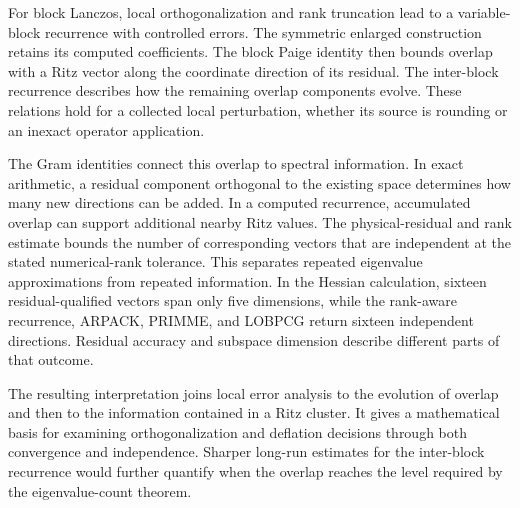 \documentclass[11pt]{article}
\theoremstyle{definition}
\begin{document}
For block Lanczos, local orthogonalization and rank truncation lead to a
variable-block recurrence with controlled errors. The symmetric enlarged
construction retains its computed coefficients. The block Paige identity
then bounds overlap with a Ritz vector along the coordinate direction of
its residual. The inter-block recurrence describes how the remaining
overlap components evolve.
These relations hold for a collected local perturbation, whether its source
is rounding or an inexact operator application.

The Gram identities connect this overlap to spectral information. In exact
arithmetic, a residual component orthogonal to the existing space determines
how many new directions can be added. In a computed recurrence, accumulated
overlap can support additional nearby Ritz values. The physical-residual and
rank estimate bounds the number of corresponding vectors that are independent
at the stated numerical-rank tolerance.
This separates repeated eigenvalue approximations from repeated information.
In the Hessian calculation, sixteen residual-qualified vectors span only
five dimensions, while the rank-aware recurrence, ARPACK, PRIMME, and LOBPCG
return sixteen independent directions. Residual accuracy and subspace
dimension describe different parts of that outcome.

The resulting interpretation joins local error analysis to the evolution of
overlap and then to the information contained in a Ritz cluster. It gives a
mathematical basis for examining orthogonalization and deflation decisions
through both convergence and independence. Sharper long-run estimates for
the inter-block recurrence would further quantify when the overlap reaches
the level required by the eigenvalue-count theorem.

\begingroup
\small


\endgroup
\end{document}
